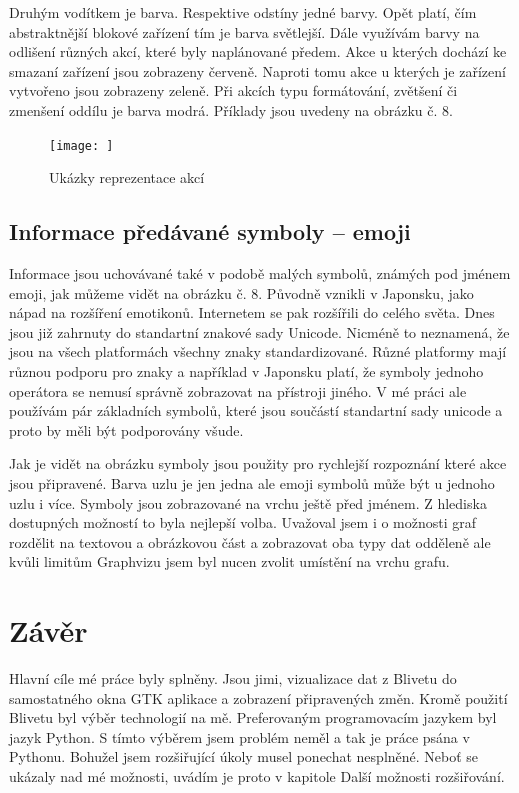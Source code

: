 \documentclass[color,table,oneside,nolot,nolof]{fithesis}
\begin{document}
	Druhým vodítkem je barva. Respektive odstíny jedné barvy. Opět platí, čím abstraktnější blokové zařízení tím je barva světlejší. Dále využívám
	barvy na odlišení různých akcí, které byly naplánované předem. Akce u kterých dochází ke smazaní zařízení jsou zobrazeny červeně. Naproti tomu akce
	u kterých je zařízení vytvořeno jsou zobrazeny zeleně. Při akcích typu formátování, zvětšení či zmenšení oddílu je barva modrá. Příklady jsou uvedeny na obrázku č. 8.

\begin{figure}[hb]
	\label{fig:Reprezentace naplánované akce}
	\caption{Ukázky reprezentace akcí}
	\centering
	\texttt{[image: ]}
\end{figure}
  
\section{Informace předávané symboly -- emoji}
  Informace jsou uchovávané také v podobě malých symbolů, známých pod jménem emoji, jak můžeme vidět na obrázku č. 8.
	Původně vznikli v Japonsku, jako nápad na rozšíření emotikonů. Internetem se pak rozšířili do
	celého světa. Dnes jsou již zahrnuty do standartní znakové sady Unicode. Nicméně to neznamená, že jsou na všech platformách všechny znaky standardizované. Různé platformy mají různou
	podporu pro znaky a například v Japonsku platí, že symboly jednoho operátora se nemusí správně zobrazovat na přístroji jiného. V mé práci ale používám pár základních symbolů, které 
	jsou součástí standartní sady unicode a proto by měli být podporovány všude.

  Jak je vidět na obrázku symboly jsou použity pro rychlejší rozpoznání které akce jsou připravené. Barva uzlu je jen jedna ale emoji symbolů může být u jednoho uzlu i více. Symboly jsou
	zobrazované na vrchu ještě před jménem. Z hlediska dostupných možností to byla nejlepší volba. Uvažoval jsem i o možnosti graf rozdělit na textovou a obrázkovou část a zobrazovat
	oba typy dat odděleně ale kvůli limitům Graphvizu jsem byl nucen zvolit umístění na vrchu grafu.

\chapter{Závěr}
  Hlavní cíle mé práce byly splněny. Jsou jimi, vizualizace dat z Blivetu do samostatného okna GTK aplikace a zobrazení připravených změn. Kromě použití Blivetu byl
	výběr technologií na mě. Preferovaným programovacím jazykem byl jazyk Python. S tímto výběrem jsem problém neměl a tak je práce psána v Pythonu. Bohužel jsem rozšiřující úkoly musel
	ponechat nesplněné. Neboť se ukázaly nad mé možnosti, uvádím je proto v kapitole Další možnosti rozšiřování.
\end{document}
